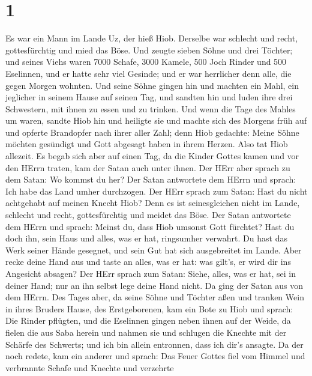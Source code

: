 \hypertarget{section}{%
\section{1}\label{section}}

 Es war ein Mann im Lande Uz, der hieß Hiob. Derselbe war
schlecht und recht, gottesfürchtig und mied das Böse.  Und
zeugte sieben Söhne und drei Töchter;  und seines Viehs
waren 7000 Schafe, 3000 Kamele, 500 Joch Rinder und 500 Eselinnen, und
er hatte sehr viel Gesinde; und er war herrlicher denn alle, die gegen
Morgen wohnten.  Und seine Söhne gingen hin und machten ein
Mahl, ein jeglicher in seinem Hause auf seinen Tag, und sandten hin und
luden ihre drei Schwestern, mit ihnen zu essen und zu trinken.
 Und wenn die Tage des Mahles um waren, sandte Hiob hin und
heiligte sie und machte sich des Morgens früh auf und opferte Brandopfer
nach ihrer aller Zahl; denn Hiob gedachte: Meine Söhne möchten gesündigt
und Gott abgesagt haben in ihrem Herzen. Also tat Hiob allezeit.
 Es begab sich aber auf einen Tag, da die Kinder Gottes
kamen und vor den HErrn traten, kam der Satan auch unter ihnen.
 Der HErr aber sprach zu dem Satan: Wo kommst du her? Der
Satan antwortete dem HErrn und sprach: Ich habe das Land umher
durchzogen.  Der HErr sprach zum Satan: Hast du nicht
achtgehabt auf meinen Knecht Hiob? Denn es ist seinesgleichen nicht im
Lande, schlecht und recht, gottesfürchtig und meidet das Böse.
 Der Satan antwortete dem HErrn und sprach: Meinst du, dass
Hiob umsonst Gott fürchtet?  Hast du doch ihn, sein Haus
und alles, was er hat, ringsumher verwahrt. Du hast das Werk seiner
Hände gesegnet, und sein Gut hat sich ausgebreitet im Lande.
 Aber recke deine Hand aus und taste an alles, was er hat:
was gilt's, er wird dir ins Angesicht absagen?  Der HErr
sprach zum Satan: Siehe, alles, was er hat, sei in deiner Hand; nur an
ihn selbst lege deine Hand nicht. Da ging der Satan aus von dem HErrn.
 Des Tages aber, da seine Söhne und Töchter aßen und
tranken Wein in ihres Bruders Hause, des Erstgeborenen, 
kam ein Bote zu Hiob und sprach: Die Rinder pflügten, und die Eselinnen
gingen neben ihnen auf der Weide,  da fielen die aus Saba
herein und nahmen sie und schlugen die Knechte mit der Schärfe des
Schwerts; und ich bin allein entronnen, dass ich dir's ansagte.
 Da der noch redete, kam ein anderer und sprach: Das Feuer
Gottes fiel vom Himmel und verbrannte Schafe und Knechte und verzehrte
